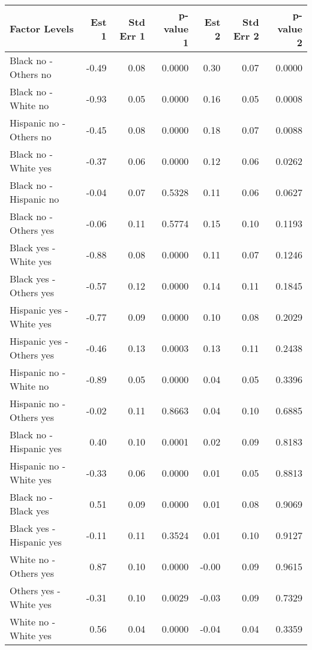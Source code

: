 \documentclass[11pt]{extarticle} %
\begin{document}
\begin{table}[H]
\footnotesize
\centering
\begin{tabular}{lrrrrrr}
  \hline
Factor Levels & Est 1 & Std Err 1 & p-value 1 & Est 2 & Std Err 2 & p-value 2 \\ 
  \hline
  Black no -  Others no & -0.49 & 0.08 & 0.0000 & 0.30 & 0.07 & 0.0000 \\ 
    Black no -  White no & -0.93 & 0.05 & 0.0000 & 0.16 & 0.05 & 0.0008 \\ 
    Hispanic no -  Others no & -0.45 & 0.08 & 0.0000 & 0.18 & 0.07 & 0.0088 \\ 
    Black no -  White yes & -0.37 & 0.06 & 0.0000 & 0.12 & 0.06 & 0.0262 \\ 
    Black no -  Hispanic no & -0.04 & 0.07 & 0.5328 & 0.11 & 0.06 & 0.0627 \\ 
    Black no -  Others yes & -0.06 & 0.11 & 0.5774 & 0.15 & 0.10 & 0.1193 \\ 
    Black yes -  White yes & -0.88 & 0.08 & 0.0000 & 0.11 & 0.07 & 0.1246 \\ 
    Black yes -  Others yes & -0.57 & 0.12 & 0.0000 & 0.14 & 0.11 & 0.1845 \\ 
    Hispanic yes -  White yes & -0.77 & 0.09 & 0.0000 & 0.10 & 0.08 & 0.2029 \\ 
    Hispanic yes -  Others yes & -0.46 & 0.13 & 0.0003 & 0.13 & 0.11 & 0.2438 \\ 
    Hispanic no -  White no & -0.89 & 0.05 & 0.0000 & 0.04 & 0.05 & 0.3396 \\ 
    Hispanic no -  Others yes & -0.02 & 0.11 & 0.8663 & 0.04 & 0.10 & 0.6885 \\ 
    Black no -  Hispanic yes & 0.40 & 0.10 & 0.0001 & 0.02 & 0.09 & 0.8183 \\ 
    Hispanic no -  White yes & -0.33 & 0.06 & 0.0000 & 0.01 & 0.05 & 0.8813 \\ 
    Black no -  Black yes & 0.51 & 0.09 & 0.0000 & 0.01 & 0.08 & 0.9069 \\ 
    Black yes -  Hispanic yes & -0.11 & 0.11 & 0.3524 & 0.01 & 0.10 & 0.9127 \\ 
    White no -  Others yes & 0.87 & 0.10 & 0.0000 & -0.00 & 0.09 & 0.9615 \\ 
    Others yes -  White yes & -0.31 & 0.10 & 0.0029 & -0.03 & 0.09 & 0.7329 \\ 
    White no -  White yes & 0.56 & 0.04 & 0.0000 & -0.04 & 0.04 & 0.3359 \\ 

\end{tabular}
\end{table}
\end{document}
